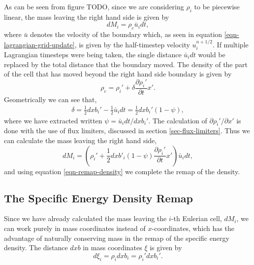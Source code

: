 As can be seen from figure TODO, since we are considering $\rho_i$ to be piecewise linear, the mass leaving the right hand side is given by
\begin{equation}
  dM_i = \rho_c \bar{u}_i dt,
\end{equation}
where $\bar{u}$ denotes the velocity of the boundary which, as seen in equation \eqref{eqn-lagrangian-grid-update}, is given by the half-timestep velocity $u_i^{n+1/2}$. If multiple Lagrangian timesteps were being taken, the single distance $\bar{u}_i dt$ would be replaced by the total distance that the boundary moved. The density of the part of the cell that has moved beyond the right hand side boundary is given by
\begin{equation}
  \rho_c = \rho_i' + \delta \frac{\partial \rho_i'}{\partial t}{x'}.
\end{equation}
Geometrically we can see that,
\begin{align}
  \delta =  \frac{1}{2} dxb_i' - \frac{1}{2} \bar{u}_i dt = \frac{1}{2} dxb_i'(1-\psi),
\end{align}
where we have extracted  written $\psi = \bar{u}_i dt / dxb_i'$. The calculation of $\partial\rho_i'/ \partial x'$ is done with the use of flux limiters, discussed in section \ref{sec-flux-limiters}. Thus we can calculate the mass leaving the right hand side, 
\begin{equation}
dM_i = \left( \rho_i' + \frac{1}{2}dxb'_i(1-\psi) \frac{\partial \rho_i'}{\partial t}{x'} \right) \bar{u}_i dt,
\label{eqn-remap-mass-diff}
\end{equation} 
and using equation \eqref{eqn-remap-density} we complete the remap of the density.

\subsection{The Specific Energy Density Remap}
Since we have already calculated the mass leaving the $i$-th Eulerian cell, $dM_i$, we can work purely in mass coordinates instead of $x$-coordinates, which has the advantage of naturally conserving mass in the remap of the specific energy density. The distance $dxb$ in mass coordinates $\xi$ is given by
\begin{equation}
  d\xi_i = \rho_i dxb_i = \rho_i' dxb_i'.
\end{equation}

